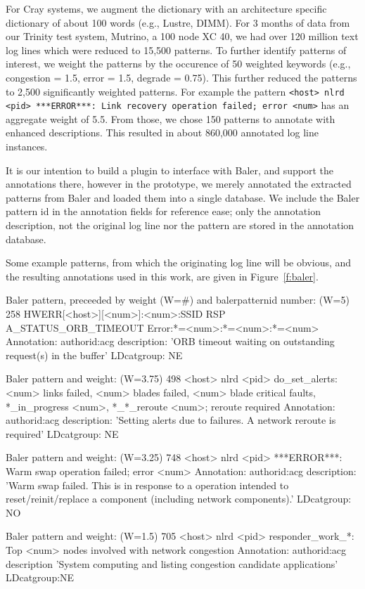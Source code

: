 For Cray systems, we augment
the dictionary with an architecture specific dictionary of about 100 words (e.g., Lustre, DIMM).
For 3 months of data from our Trinity test system, Mutrino, a 100 node XC 40,
we had over 120 million text log lines which were reduced to 15,500 patterns. To further identify patterns
of interest, we weight the patterns by the occurence of 50 weighted
keywords (e.g., congestion = 1.5, error = 1.5, degrade = 0.75). This further reduced the patterns
to 2,500 significantly weighted patterns. For example the pattern
\texttt{<host> nlrd <pid> ***ERROR***: Link recovery operation failed; error <num>} has
an aggregate weight of 5.5. From those, we chose 150
patterns to annotate with enhanced descriptions. This resulted in about 860,000
annotated log line instances.

It is our intention to
build a plugin to interface with Baler, and support the annotations there,
however in the prototype, we merely annotated the extracted patterns from
Baler and loaded them into a single database.
We include the Baler pattern id in the annotation fields
for reference ease; only the annotation description, not the original log line nor the pattern
are stored in the annotation database.

Some example patterns, from which the originating log line will be obvious, and
the resulting annotations used in this work, are given in Figure~\ref{f:baler}.

\begin{figure*}
\begin{annol}

Baler pattern, preceeded by weight (W=#) and balerpatternid number:
(W=5)        258   HWERR[<host>][<num>]:<num>:SSID RSP A_STATUS_ORB_TIMEOUT Error:*=<num>:*=<num>:*=<num>
Annotation:
authorid:acg  description: 'ORB timeout waiting on outstanding request(s) in the buffer'  LDcatgroup: NE

Baler pattern and weight:
(W=3.75)     498   <host> nlrd <pid> do_set_alerts: <num> links failed, <num> blades failed, <num> blade critical faults, *_in_progress <num>, *_*_reroute <num>; reroute required
Annotation:
authorid:acg  description: 'Setting alerts due to failures. A network reroute is required' LDcatgroup: NE

Baler pattern and weight:
(W=3.25)     748   <host> nlrd <pid> ***ERROR***: Warm swap operation failed; error <num>
Annotation:
authorid:acg description: 'Warm swap failed. This is in response to a operation intended to reset/reinit/replace a component (including network components).' LDcatgroup: NO

Baler pattern and weight:
(W=1.5)      705   <host> nlrd <pid> responder_work_*: Top <num> nodes involved with network congestion
Annotation:
authorid:acg description 'System computing and listing congestion candidate applications' LDcatgroup:NE
\end{annol}
\caption{Example Baler patterns extracted from log lines and their annotated versions. Events to annotate are based on
knowledge of significant events. Annotation descriptions can provide additional context to non-self-explanatory log messages.}
\label{f:baler}
\end{figure*}


